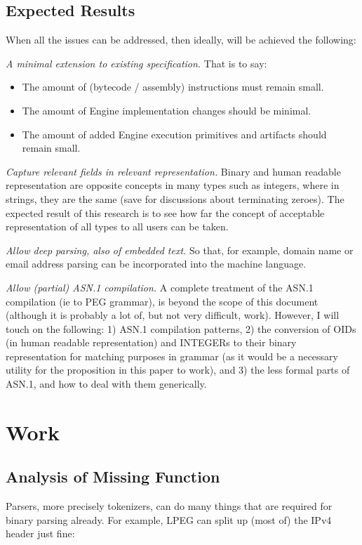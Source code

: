 \subsection{Expected Results}
When all the issues can be addressed, then ideally, will be achieved the 
following:

\textit{A minimal extension to existing specification.} That is to say:
\begin{itemize}
    \item The amount of (bytecode / assembly) instructions must remain small.
    \item The amount of Engine implementation changes should be minimal.
    \item The amount of added Engine execution primitives and artifacts 
should remain small.
\end{itemize}

\textit{Capture relevant fields in relevant representation.} Binary and human 
readable representation are opposite concepts in many types such as 
integers, where in strings, they are the same (save for discussions about 
terminating zeroes). The expected result of this research is to see how 
far the concept of acceptable representation of all types to all users can 
be taken.

\textit{Allow deep parsing, also of embedded text.} So that, for example,
domain name or email address parsing can be incorporated into the machine 
language.

\textit{Allow (partial) ASN.1 compilation.} A complete treatment of the ASN.1 
compilation (ie to PEG grammar), is beyond the scope of this document 
(although it is probably a lot of, but not very difficult, work). However, 
I will touch on the following: 1) ASN.1 compilation patterns, 2) the 
conversion of OIDs (in human readable representation) and INTEGERs to 
their binary representation for matching purposes in grammar (as it would 
be a necessary utility for the proposition in this paper to work), and 3) 
the less formal parts of ASN.1, and how to deal with them generically.

\newpage
\section{Work}

\subsection{Analysis of Missing Function}
Parsers, more precisely tokenizers, can do many things that are required 
for binary parsing already. For example, LPEG can split up (most of) the 
IPv4 header just fine:

